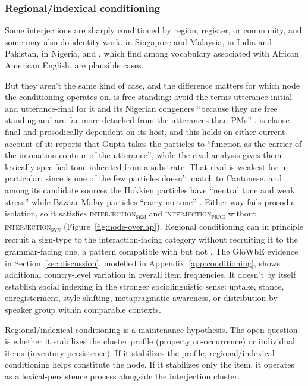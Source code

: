 \documentclass[12pt]{article}
\newcommand{\intj}[1]{\textsc{interjection\textsubscript{#1}}}
\begin{document}
\subsubsection{Regional/indexical conditioning}

Some interjections are sharply conditioned by region, register, or
community, and some may also do identity work.  in
Singapore and Malaysia,  in India and Pakistan,
 in Nigeria, and , which \textcite[8]{louf2023}
find among vocabulary associated with African American English, are
plausible cases.

But they aren't the same kind of case, and the difference matters for
which node the conditioning operates on.  is free-standing:
\textcite{unuabonahdaniel2020} avoid the terms utterance-initial and
utterance-final for it and its Nigerian congeners \enquote{because they are
free standing and are far more detached from the utterances than PMs}
\citep[69]{unuabonahdaniel2020}.  is clause-final and
prosodically dependent on its host, and this holds on either current account of
it: \textcite[447]{lim2007} reports that Gupta takes the particles to
\enquote{function as the carrier of the intonation contour of the utterance},
while the rival analysis gives them lexically-specified tone inherited from a
substrate. That rival is weakest for  in particular, since
 is one of the few particles \textcite[463]{lim2007} doesn't
match to Cantonese, and among its candidate sources the Hokkien particles
have \enquote{neutral tone and weak stress} while Bazaar Malay particles
\enquote{carry no tone} \citep[462--463]{lim2007}. Either way  fails
prosodic isolation, so it satisfies \intj{sem} and \intj{prag} without
\intj{syn} (Figure~\ref{fig:node-overlap}). Regional conditioning can
in principle recruit a sign-type to the interaction-facing category without
recruiting it to the grammar-facing one, a pattern compatible with
 but not . The GloWbE evidence in
Section~\ref{sec:discussion}, modelled in
Appendix~\ref{app:conditioning}, shows additional country-level variation in
overall item frequencies. It
doesn't by itself establish social indexing in the stronger
sociolinguistic sense: uptake, stance, enregisterment, style shifting,
metapragmatic awareness, or distribution by speaker group within
comparable contexts.

Regional/indexical conditioning is a maintenance hypothesis.
The open question is whether it stabilizes the cluster profile (property
co-occurrence) or individual items (inventory persistence). If it
stabilizes the profile, regional/indexical conditioning helps constitute
the node. If it stabilizes only the item, it operates as a
lexical-persistence process alongside the interjection cluster.
\end{document}
